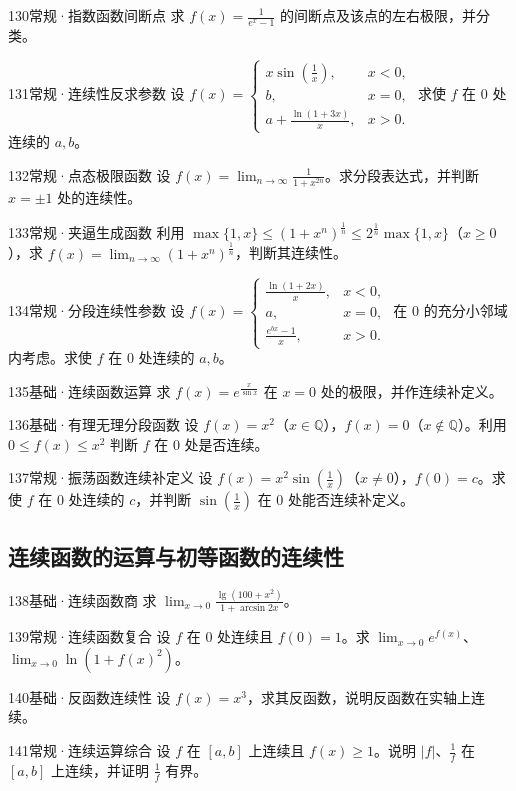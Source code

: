 \begin{exercise}{130}{常规·指数函数间断点}
求 $f(x)=\frac{1}{e^x-1}$ 的间断点及该点的左右极限，并分类。
\end{exercise}
\begin{exercise}{131}{常规·连续性反求参数}
设 $f(x)=\begin{cases}x\sin(\frac{1}{x}),&x<0,\\b,&x=0,\\a+\frac{\ln(1+3x)}{x},&x>0.\end{cases}$ 求使 $f$ 在 $0$ 处连续的 $a,b$。
\end{exercise}
\begin{exercise}{132}{常规·点态极限函数}
设 $f(x)=\lim_{n\to\infty}\frac{1}{1+x^{2n}}$。求分段表达式，并判断 $x=\pm1$ 处的连续性。
\end{exercise}
\begin{exercise}{133}{常规·夹逼生成函数}
利用 $\max\{1,x\}\le(1+x^n)^{\frac{1}{n}}\le2^{\frac{1}{n}}\max\{1,x\}$（$x\ge0$），求 $f(x)=\lim_{n\to\infty}(1+x^n)^{\frac{1}{n}}$，判断其连续性。
\end{exercise}
\begin{exercise}{134}{常规·分段连续性参数}
设 $f(x)=\begin{cases}\frac{\ln(1+2x)}{x},&x<0,\\a,&x=0,\\\frac{e^{bx}-1}{x},&x>0.\end{cases}$ 在 $0$ 的充分小邻域内考虑。求使 $f$ 在 $0$ 处连续的 $a,b$。
\end{exercise}
\begin{exercise}{135}{基础·连续函数运算}
求 $f(x)=e^{\frac{x}{\sin x}}$ 在 $x=0$ 处的极限，并作连续补定义。
\end{exercise}
\begin{exercise}{136}{基础·有理无理分段函数}
设 $f(x)=x^2$（$x\in\mathbb Q$），$f(x)=0$（$x\notin\mathbb Q$）。利用 $0\le f(x)\le x^2$ 判断 $f$ 在 $0$ 处是否连续。
\end{exercise}
\begin{exercise}{137}{常规·振荡函数连续补定义}
设 $f(x)=x^2\sin(\frac{1}{x})$（$x\ne0$），$f(0)=c$。求使 $f$ 在 $0$ 处连续的 $c$，并判断 $\sin(\frac{1}{x})$ 在 $0$ 处能否连续补定义。
\end{exercise}
\subsection{连续函数的运算与初等函数的连续性}
\begin{exercise}{138}{基础·连续函数商}
求 $\lim_{x\to0}\frac{\lg(100+x^2)}{1+\arcsin2x}$。
\end{exercise}
\begin{exercise}{139}{常规·连续函数复合}
设 $f$ 在 $0$ 处连续且 $f(0)=1$。求 $\lim_{x\to0}e^{f(x)}$、$\lim_{x\to0}\ln(1+f(x)^2)$。
\end{exercise}
\begin{exercise}{140}{基础·反函数连续性}
设 $f(x)=x^3$，求其反函数，说明反函数在实轴上连续。
\end{exercise}
\begin{exercise}{141}{常规·连续运算综合}
设 $f$ 在 $[a,b]$ 上连续且 $f(x)\ge1$。说明 $|f|$、$\frac{1}{f}$ 在 $[a,b]$ 上连续，并证明 $\frac{1}{f}$ 有界。
\end{exercise}
